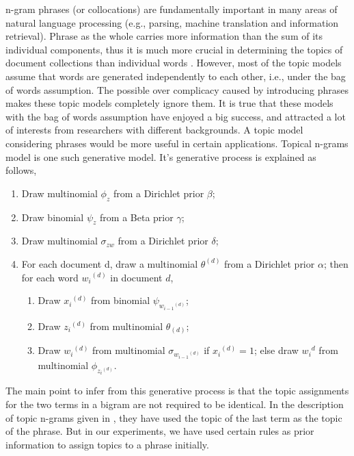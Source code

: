 n-gram phrases (or collocations) are fundamentally important in many areas of natural language processing (e.g., parsing, machine translation and information retrieval). 
Phrase as the whole carries more information than the sum of its individual components, thus it is much more crucial in determining the topics of document collections 
than individual words \citep*{wang2005note}. However, most of the topic models assume that words are generated independently to each other, i.e., under the bag of words
assumption. The possible over complicacy caused by introducing phrases makes these topic models completely ignore them. It is true that these models with the bag of words
assumption have enjoyed a big success, and attracted a lot of interests from researchers with different backgrounds. A topic model considering phrases would be more 
useful in certain applications. Topical n-grams model is one such generative model. It's generative process is explained as follows,

\begin{enumerate}
 \item Draw multinomial \(\phi_z\) from a Dirichlet prior \(\beta\);
 \item Draw binomial \(\psi_z\) from a Beta prior \(\gamma\);
 \item Draw multinomial \(\sigma_{zw}\) from a Dirichlet prior \(\delta\);
 \item For each document d, draw a multinomial \(θ^{(d)}\) from a Dirichlet prior \(\alpha\); then for each word \({w_i}^{(d)}\) in document \(d\),
    \begin{enumerate}
     \item Draw \({x_i}^{(d)}\) from binomial \(\psi_{{w_{i-1}}^{(d)}}\);
     \item Draw \({z_i}^{(d)}\) from multinomial \(\theta_{(d)}\);
     \item Draw \({w_i}^{(d)}\) from multinomial \(\sigma_{{w_{i-1}}^{(d)}}\) if \({x_i}^{(d)} = 1\); else draw \({w_i}^{d}\) from multinomial \(\phi_{{z_i}^{(d)}}\).
    \end{enumerate}
\end{enumerate}

The main point to infer from this generative process is that the topic assignments for the two terms in a bigram are not required to be identical. In the description of
topic n-grams given in \citep*{wang2005note}, they have used the topic of the last term as the topic of the phrase. But in our experiments, we have used certain rules
as prior information to assign topics to a phrase initially.


